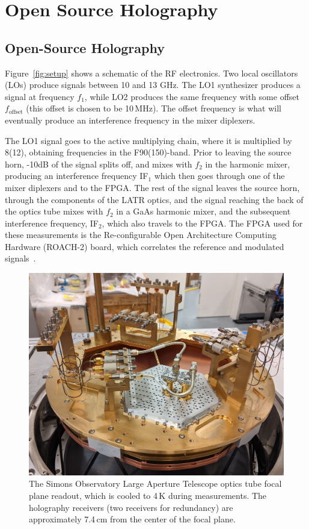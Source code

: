 \chapter{Open Source Holography} %
\label{app:holog}

\section{Open-Source Holography}
\label{sec:appendix_hardware}

Figure~\ref{fig:setup} shows a schematic of the RF electronics.  Two local oscillators (LOs) produce signals between 10 and 13 GHz. The LO1 synthesizer produces a signal at frequency $f_1$, while LO2 produces the same frequency with some offset $f_{\text{offset}}$ (this offset is chosen to be 10\,MHz).  The offset frequency is what will eventually produce an interference frequency in the mixer diplexers.

The LO1 signal goes to the active multiplying chain, where it is multiplied by 8(12), obtaining frequencies in the F90(150)-band.  Prior to leaving the source horn, -10dB of the signal splits off, and mixes with $f_2$ in the harmonic mixer, producing an interference frequency IF$_1$ which then goes through one of the mixer diplexers and to the FPGA.  The rest of the signal leaves the source horn, through the components of the LATR optics, and the signal reaching the back of the optics tube mixes with $f_2$ in a GaAs harmonic mixer, and the subsequent interference frequency, IF$_2$, which also travels to the FPGA.  The FPGA used for these measurements is the Re-configurable Open Architecture Computing Hardware (ROACH-2) board, which correlates the reference and modulated signals~\cite{roach2}.

\begin{figure}[ht]
    \centering
    \includegraphics[width = .7\textwidth]{Figures/FPA.jpeg}
    \caption{The Simons Observatory Large Aperture Telescope optics tube focal plane readout, which is cooled to 4\,K during measurements.  The holography receivers (two receivers for redundancy) are approximately 7.4\,cm from the center of the focal plane.}
    \label{fig:fpa}
\end{figure}

